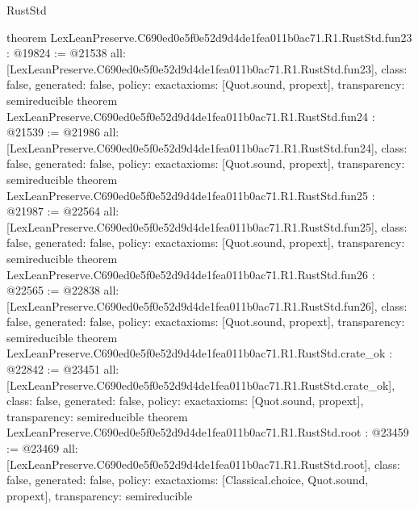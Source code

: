 \begin{lexlean}{RustStd}
\begin{coremodule}
{}
theorem LexLeanPreserve.C690ed0e5f0e52d9d4de1fea011b0ac71.R1.RustStd.fun23 : @19824 := @21538 {
  all: [LexLeanPreserve.C690ed0e5f0e52d9d4de1fea011b0ac71.R1.RustStd.fun23],
  class: false,
  generated: false,
  policy: exact{axioms: [Quot.sound, propext]},
  transparency: semireducible
}
theorem LexLeanPreserve.C690ed0e5f0e52d9d4de1fea011b0ac71.R1.RustStd.fun24 : @21539 := @21986 {
  all: [LexLeanPreserve.C690ed0e5f0e52d9d4de1fea011b0ac71.R1.RustStd.fun24],
  class: false,
  generated: false,
  policy: exact{axioms: [Quot.sound, propext]},
  transparency: semireducible
}
theorem LexLeanPreserve.C690ed0e5f0e52d9d4de1fea011b0ac71.R1.RustStd.fun25 : @21987 := @22564 {
  all: [LexLeanPreserve.C690ed0e5f0e52d9d4de1fea011b0ac71.R1.RustStd.fun25],
  class: false,
  generated: false,
  policy: exact{axioms: [Quot.sound, propext]},
  transparency: semireducible
}
theorem LexLeanPreserve.C690ed0e5f0e52d9d4de1fea011b0ac71.R1.RustStd.fun26 : @22565 := @22838 {
  all: [LexLeanPreserve.C690ed0e5f0e52d9d4de1fea011b0ac71.R1.RustStd.fun26],
  class: false,
  generated: false,
  policy: exact{axioms: [Quot.sound, propext]},
  transparency: semireducible
}
theorem LexLeanPreserve.C690ed0e5f0e52d9d4de1fea011b0ac71.R1.RustStd.crate_ok : @22842 := @23451 {
  all: [LexLeanPreserve.C690ed0e5f0e52d9d4de1fea011b0ac71.R1.RustStd.crate_ok],
  class: false,
  generated: false,
  policy: exact{axioms: [Quot.sound, propext]},
  transparency: semireducible
}
theorem LexLeanPreserve.C690ed0e5f0e52d9d4de1fea011b0ac71.R1.RustStd.root : @23459 := @23469 {
  all: [LexLeanPreserve.C690ed0e5f0e52d9d4de1fea011b0ac71.R1.RustStd.root],
  class: false,
  generated: false,
  policy: exact{axioms: [Classical.choice, Quot.sound, propext]},
  transparency: semireducible
}


\end{coremodule}
\end{lexlean}
